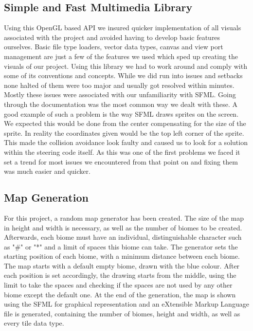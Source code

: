 \documentclass[a4paper]{report}
\begin{document}
\subsection{Simple and Fast Multimedia Library}
Using this OpenGL based API we insured quicker implementation of all visuals associated with the project and avoided having to develop basic features ourselves. Basic file type loaders, vector data types, canvas and view port management are just a few of the features we used which sped up creating the visuals of our project. Using this library we had to work around and comply with some of its conventions and concepts. 
While we did run into issues and setbacks none halted of them were too major and usually got resolved within minutes. Mostly these issues were associated with our unfamiliarity with SFML. Going through the documentation was the most common way we dealt with these.
A good example of such a problem is the way SFML draws sprites on the screen. We expected this would be done from the center compensating for the size of the sprite. In reality the coordinates given would be the top left corner of the sprite. This made the collision avoidance look faulty and caused us to look for a solution within the steering code itself. As this was one of the first problems we faced it set a trend for most issues we encountered from that point on and fixing them was much easier and quicker. 
\subsection{Map Generation}
For this project, a random map generator has been created. The size of the map in height and width is necessary, as well as the number of biomes to be created. Afterwards, each biome must have an individual, distinguishable character such as "\#" or "*" and a limit of spaces this biome can take. The generator sets the starting position of each biome, with a minimum distance between each biome. The map starts with a default empty biome, drawn with the blue colour. After each position is set accordingly, the drawing starts from the middle, using the limit to take the spaces and checking if the spaces are not used by any other biome except the default one.	At the end of the generation, the map is shown using the SFML for graphical representation and an eXtensible Markup Language file is generated, containing the number of biomes, height and width, as well as every tile data type.
\end{document}
